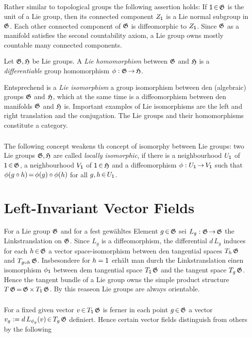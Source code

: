 \documentclass[11pt,twoside]{article}
\begin{document}
\subparagraph{}
Rather similar to topological groups the following assertion holds:
If ${\mathsf{1}} {\,\in\,} \mathfrak{G}$ is the unit of a Lie group,
then its connected component $Z_{{\mathsf{1}}}$ is a Lie normal subgroup in $\mathfrak{G}$.
Each other connected component of $\mathfrak{G}$ is diffeomorphic to $Z_{{\mathsf{1}}}$.
Since $\mathfrak{G}$ as a manifold satisfies the second countability axiom,
a Lie group owns mostly countable many connected components.

\begin{definition}
Let $\mathfrak{G},\mathfrak{H}$ be Lie groups.
A \textit{Lie homomorphism} between $\mathfrak{G}$ and $\mathfrak{H}$
is a \textit{differentiable} group homomorphism $\phi:\mathfrak{G} {\,\to\,} \mathfrak{H}$.
\end{definition}

Entsprechend is a \textit{Lie isomorphism} a group isomorphism
between den (algebraic) groups $\mathfrak{G}$ and $\mathfrak{H}$,
which at the same time is a diffeomorphism
between den manifolds $\mathfrak{G}$ and $\mathfrak{H}$ is.
Important examples of Lie isomorphisms are the left and right translation
and the conjugation.
The Lie groups and their homomorphisms constitute a category.

\subparagraph{}
The following concept weakens th concept of isomorphy between Lie groups:
two Lie groups $\mathfrak{G},\mathfrak{H}$ are called \textit{locally isomorphic},
if there is a neighbourhood $U_{{\mathsf{1}}}$ of ${\mathsf{1}} {\,\in\,} \mathfrak{G}$,
a neighbourhood $V_{{\mathsf{1}}}$ of ${\mathsf{1}} {\,\in\,} \mathfrak{H}$
and a diffeomorphism $\phi:U_{{\mathsf{1}}} {\,\to\,} V_{{\mathsf{1}}}$
such that
$\phi(g \circ h) {\,=\,} \phi(g) \circ \phi(h)$ for all $g,h {\,\in\,} U_{{\mathsf{1}}}$.

\section{Left-Invariant Vector Fields}
For a Lie group $\mathfrak{G}$ and for a fest gew\"ahltes Element
$g {\,\in\,} \mathfrak{G}$ sei $L_g:\mathfrak{G} {\,\to\,} \mathfrak{G}$ the Linkstranslation on $\mathfrak{G}$.
Since $L_g$ is a diffeomorphism,
the differential $d\,L_g$ induces
for each $h {\,\in\,} \mathfrak{G}$ a vector space-isomorphism between den
tangential spaces $T_h\,\mathfrak{G}$ and $T_{g \circ h}\,\mathfrak{G}$.
Insbesondere for $h={\mathsf{1}}$ erh\"alt man durch the Linkstranslation
einen isomorphism $\phi_{{\mathsf{1}}}$ between dem
tangential space $T_{{\mathsf{1}}}\,\mathfrak{G}$ and the tangent space $T_g\,\mathfrak{G}$.
Hence the tangent bundle of a Lie group owns the simple
product structure $T\,\mathfrak{G} {\,=\,} \mathfrak{G} {\,\times\,} T_{{\mathsf{1}}}\,\mathfrak{G}$.
By this reaseon Lie groups are always orientable.

\subparagraph{}
For a fixed given vector $v {\,\in\,} T_{{\mathsf{1}}}\,\mathfrak{G}$ is ferner
in each point $g {\,\in\,} \mathfrak{G}$ a vector
$v_g := d\,L_{\phi_g}(v) {\,\in\,} T_g\,\mathfrak{G}$ definiert.
Hence certain vector fields distinguish from others by the following
\end{document}
